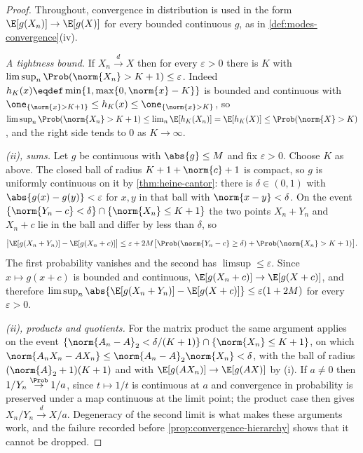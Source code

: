 \begin{proof}
	Throughout, convergence in distribution is used in the form
	$\E[g(X_n)]\to\E[g(X)]$ for every bounded continuous $g$, as in
	\autoref{def:modes-convergence}(iv).

	\emph{A tightness bound.} If $X_n\overset{d}{\to}X$ then for every
	$\varepsilon>0$ there is $K$ with
	$\limsup_n\Prob(\norm{X_n}>K+1)\leq\varepsilon$. Indeed
	$h_K(x)\eqdef\min\{1,\max\{0,\norm{x}-K\}\}$ is bounded and continuous with
	$\one_{\{\norm{x}>K+1\}}\leq h_K(x)\leq\one_{\{\norm{x}>K\}}$, so
	$\limsup_n\Prob(\norm{X_n}>K+1)\leq\lim_n\E[h_K(X_n)]=\E[h_K(X)]
		\leq\Prob(\norm{X}>K)$, and the right side tends to $0$ as $K\to\infty$.

	\emph{(ii), sums.} Let $g$ be continuous with $\abs{g}\leq M$ and fix
	$\varepsilon>0$. Choose $K$ as above. The closed ball of radius
	$K+1+\norm{c}+1$ is compact, so $g$ is uniformly continuous on it by
	\autoref{thm:heine-cantor}: there is $\delta\in(0,1)$ with
	$\abs{g(x)-g(y)}<\varepsilon$ for $x,y$ in that ball with
	$\norm{x-y}<\delta$. On the event
	$\{\norm{Y_n-c}<\delta\}\cap\{\norm{X_n}\leq K+1\}$ the two points
	$X_n+Y_n$ and $X_n+c$ lie in the ball and differ by less than $\delta$, so
	\[
		\bigl\lvert\E[g(X_n+Y_n)]-\E[g(X_n+c)]\bigr\rvert
		\leq\varepsilon+2M\bigl[\Prob(\norm{Y_n-c}\geq\delta)
			+\Prob(\norm{X_n}>K+1)\bigr].
	\]
	The first probability vanishes and the second has $\limsup\leq\varepsilon$.
	Since $x\mapsto g(x+c)$ is bounded and continuous,
	$\E[g(X_n+c)]\to\E[g(X+c)]$, and therefore
	$\limsup_n\abs{\E[g(X_n+Y_n)]-\E[g(X+c)]}\leq\varepsilon(1+2M)$ for every
	$\varepsilon>0$.

	\emph{(ii), products and quotients.} For the matrix product the same
	argument applies on the event
	$\{\norm{A_n-A}_{2}<\delta/(K+1)\}\cap\{\norm{X_n}\leq K+1\}$, on
	which $\norm{A_nX_n-AX_n}\leq\norm{A_n-A}_{2}\norm{X_n}<\delta$,
	with the ball of radius $(\norm{A}_{2}+1)(K+1)$ and with
	$\E[g(AX_n)]\to\E[g(AX)]$ by (i). If $a\neq0$ then
	$1/Y_n\overset{\Prob}{\to}1/a$, since $t\mapsto1/t$ is continuous at $a$ and
	convergence in probability is preserved under a map continuous at the limit
	point; the product case then gives $X_n/Y_n\overset{d}{\to}X/a$. Degeneracy
	of the second limit is what makes these arguments work, and the failure
	recorded before \autoref{prop:convergence-hierarchy} shows that it cannot be
	dropped.


\end{proof}
